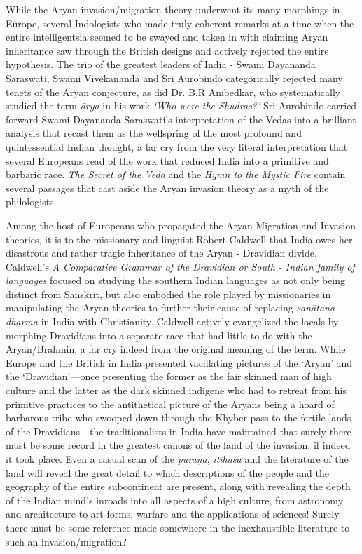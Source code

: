 While the Aryan invasion/migration theory underwent its many morphings in Europe, several Indologists who made truly coherent remarks at a time when the entire intelligentsia seemed to be swayed and taken in with claiming Aryan inheritance saw through the British designs and actively rejected the entire hypothesis. The trio of the greatest leaders of India - Swami Dayananda Saraswati, Swami Vivekananda and Sri Aurobindo categorically rejected many tenets of the Aryan conjecture, as did Dr. B.R Ambedkar, who systematically studied the term \textit{ārya} in his work \textit{‘Who were the Shudras?’} Sri Aurobindo carried forward Swami Dayananda Saraswati’s interpretation of the Vedas into a brilliant analysis that recast them as the wellspring of the most profound and quintessential Indian thought, a far cry from the very literal interpretation that several Europeans read of the work that reduced India into a primitive and barbaric race. \textit{The Secret of the Veda} and the \textit{Hymn to the Mystic Fire} contain several passages that cast aside the Aryan invasion theory as a myth of the philologists.

Among the host of Europeans who propagated the Aryan Migration and Invasion theories, it is to the missionary and linguist Robert Caldwell that India owes her disastrous and rather tragic inheritance of the Aryan - Dravidian divide. Caldwell’s \textit{A Comparative Grammar of the Dravidian or South - Indian family of languages} focused on studying the southern Indian languages as not only being distinct from Sanskrit, but also embodied the role played by missionaries in manipulating the Aryan theories to further their cause of replacing \textit{sanātana dharma} in India with Christianity. Caldwell actively evangelized the locals by morphing Dravidians into a separate race that had little to do with the Aryan/Brahmin, a far cry indeed from the original meaning of the term. While Europe and the British in India presented vacillating pictures of the ‘Aryan’ and the ‘Dravidian’—once presenting the former as the fair skinned man of high culture and the latter as the dark skinned indigene who had to retreat from his primitive practices to the antithetical picture of the Aryans being a hoard of barbarous tribe who swooped down through the Khyber pass to the fertile lands of the Dravidians—the traditionalists in India have maintained that surely there must be some record in the greatest canons of the land of the invasion, if indeed it took place. Even a casual scan of the \textit{purāṇa}, \textit{itihāsa} and the literature of the land will reveal the great detail to which descriptions of the people and the geography of the entire subcontinent are present, along with revealing the depth of the Indian mind’s inroads into all aspects of a high culture, from astronomy and architecture to art forms, warfare and the applications of sciences! Surely there must be some reference made somewhere in the inexhaustible literature to such an invasion/migration?

